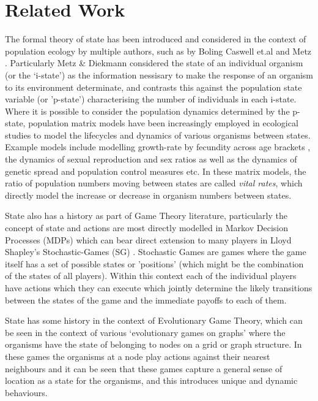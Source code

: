 \section{Related Work}\label{sec:-1}

The formal theory of state has been introduced and considered in the context of population ecology by multiple authors, 
such as by Boling \cite{BOLING1973485} Caswell et.al \cite{nla.cat-vn662318} and Metz \cite{Metz1977}. Particularly Metz \& Diekmann\cite{nla.cat-vn2330051} considered the state of an individual organism (or the `i-state') as the information nessisary to make the response of an organism to its environment determinate, and contrasts this against the population state variable (or 'p-state') characterising the number of individuals in each i-state. 
Where it is possible to consider the population dynamics determined by the p-state, population matrix models have been increasingly employed in ecological studies to model the lifecycles and dynamics of various organisms between states.\cite{doi:10.1111/j.1461-0248.2010.01540.x}
Example models include modelling growth-rate by fecundity across age brackets \cite{leslie}, the dynamics of sexual reproduction and sex ratios \cite{Shyu2018,doi:10.1111/1365-2664.12177} as well as the dynamics of genetic spread and population control measures \cite{DEVRIES2020108875} etc.
In these matrix models, the ratio of population numbers moving between states are called \textit{vital rates}, which directly model the increase or decrease in organism numbers between states.\cite{population1}

State also has a history as part of Game Theory literature, particularly the concept of state and actions are most directly modelled in Markov Decision Processes (MDPs) which can bear direct extension to many players in Lloyd Shapley's Stochastic-Games (SG) \cite{shapley53,Solan2015}. Stochastic Games are games where the game itself has a set of possible states or 'positions' (which might be the combination of the states of all players). Within this context each of the individual players have actions which they can execute which jointly determine the likely transitions between the states of the game and the immediate payoffs to each of them.

State has some history in the context of Evolutionary Game Theory, which can be seen in the context of various `evolutionary games on graphs' where the organisms have the state of belonging to nodes on a grid or graph structure. In these games the organisms at a node play actions against their nearest neighbours and it can be seen that these games capture a general sense of location as a state for the organisms, and this introduces unique and dynamic behaviours.\cite{nowak,spacial2,spacial4}

